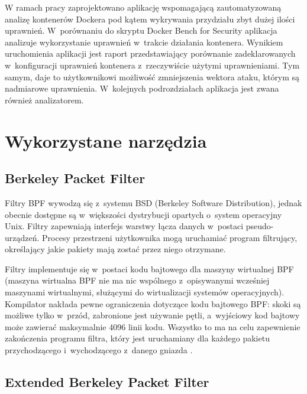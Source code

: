W ramach pracy zaprojektowano aplikację wspomagającą zautomatyzowaną analizę kontenerów Dockera pod kątem wykrywania przydziału zbyt dużej ilości uprawnień. W~porównaniu do skryptu Docker Bench for Security \cite{DockerBenchSecurity} aplikacja analizuje wykorzystanie uprawnień w~trakcie działania kontenera. Wynikiem uruchomienia aplikacji jest raport przedstawiający porównanie zadeklarowanych w~konfiguracji uprawnień kontenera z~rzeczywiście użytymi uprawnieniami. Tym samym, daje to użytkownikowi możliwość zmniejszenia wektora ataku, którym są nadmiarowe uprawnienia. W~kolejnych podrozdziałach aplikacja jest zwana również analizatorem.

\section{Wykorzystane narzędzia}

\subsection{Berkeley Packet Filter}

Filtry BPF wywodzą się z~systemu BSD (Berkeley Software Distribution), jednak obecnie dostępne są w~większości dystrybucji opartych o~system operacyjny Unix. Filtry zapewniają interfejs warstwy łącza danych w~postaci pseudo-urządzeń. Procesy przestrzeni użytkownika mogą uruchamiać program filtrujący, określający jakie pakiety mają zostać przez niego otrzymane. 

Filtry implementuje się w~postaci kodu bajtowego dla maszyny wirtualnej BPF (maszyna wirtualna BPF nie ma nic wspólnego z~opisywanymi wcześniej maszynami wirtualnymi, służącymi do wirtualizacji systemów operacyjnych). Kompilator nakłada pewne ograniczenia dotyczące kodu bajtowego BPF: skoki są możliwe tylko w~przód, zabronione jest używanie pętli, a~wyjściowy kod bajtowy może zawierać maksymalnie 4096 linii kodu. Wszystko to ma na celu zapewnienie zakończenia programu filtra, który jest uruchamiany dla każdego pakietu przychodzącego i~wychodzącego z~danego gniazda \cite{BSDPacketFilter}.

\subsection{Extended Berkeley Packet Filter}

